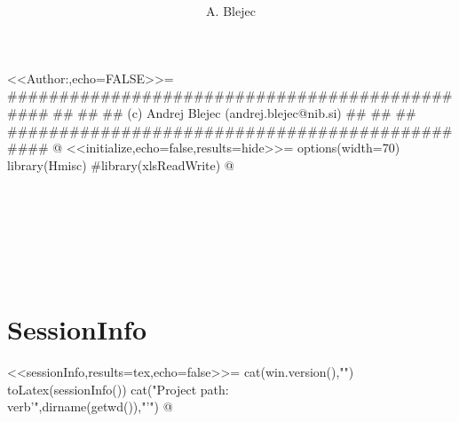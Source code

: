\documentclass[a4paper,12pt]{article}
\begin{document}
\title{}
\author{A. Blejec}
%

\maketitle
\tableofcontents
<<Author:,echo=FALSE>>=
###############################################
##                                           ##
## (c) Andrej Blejec (andrej.blejec@nib.si)  ##
##                                           ##
###############################################
@
<<initialize,echo=false,results=hide>>=
options(width=70)
library(Hmisc)
#library(xlsReadWrite)
@

\section{}




%
%

%

\clearpage
\section*{SessionInfo}
{\small
<<sessionInfo,results=tex,echo=false>>=
cat(win.version(),"\n")
toLatex(sessionInfo())
cat("Project path:\\verb'",dirname(getwd()),"'\n")
@
}
\end{document}
